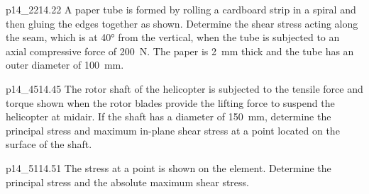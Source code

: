 \documentclass[a4paper]{article}
\newcounter{problem}
\numberwithin{equation}{problem}
\begin{document}


\begin{problemwithimage}{p14_22}{14.22}
  A paper tube is formed by rolling a cardboard strip in a spiral and then gluing the edges together as shown.
  Determine the shear stress acting along the seam, which is at \ang{40} from the vertical, when the tube is subjected to an axial compressive force of \qty{200}{\N}.
  The paper is \qty{2}{\mm} thick and the tube has an outer diameter of \qty{100}{\mm}.
\end{problemwithimage}

\begin{problemwithimage}{p14_45}{14.45}
  The rotor shaft of the helicopter is subjected to the tensile force and torque shown when the rotor blades provide the lifting force to suspend the helicopter at midair.
  If the shaft has a diameter of \qty{150}{\mm}, determine the principal stress and maximum in-plane shear stress at a point located on the surface of the shaft.
\end{problemwithimage}

\begin{problemwithimage}{p14_51}{14.51}
  The stress at a point is shown on the element.
  Determine the principal stress and the absolute maximum shear stress.
\end{problemwithimage}
\end{document}
